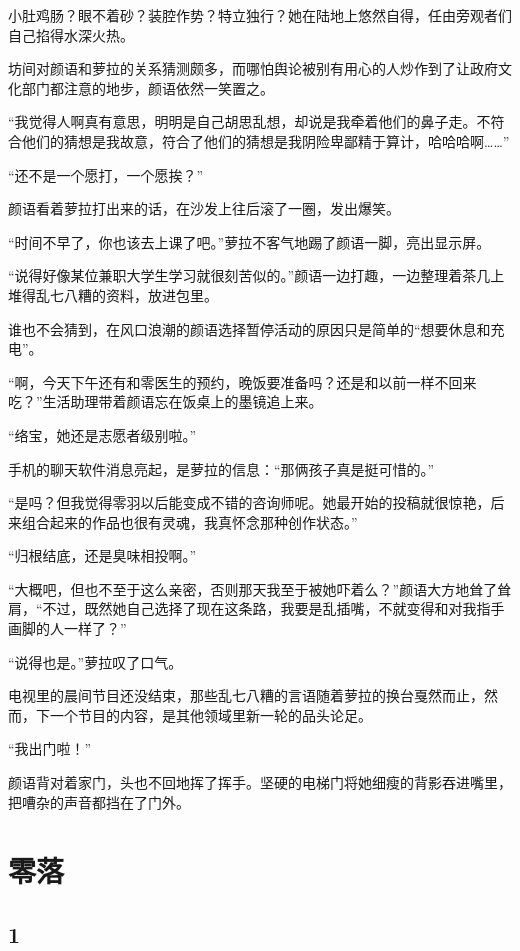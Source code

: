\documentclass[UTF8, scheme = chinese, openany]{ctexbook}
\begin{document}
小肚鸡肠？眼不着砂？装腔作势？特立独行？她在陆地上悠然自得，任由旁观者们自己掐得水深火热。

坊间对颜语和萝拉的关系猜测颇多，而哪怕舆论被别有用心的人炒作到了让政府文化部门都注意的地步，颜语依然一笑置之。

“我觉得人啊真有意思，明明是自己胡思乱想，却说是我牵着他们的鼻子走。不符合他们的猜想是我故意，符合了他们的猜想是我阴险卑鄙精于算计，哈哈哈啊……”

“还不是一个愿打，一个愿挨？”

颜语看着萝拉打出来的话，在沙发上往后滚了一圈，发出爆笑。

“时间不早了，你也该去上课了吧。”萝拉不客气地踢了颜语一脚，亮出显示屏。

“说得好像某位兼职大学生学习就很刻苦似的。”颜语一边打趣，一边整理着茶几上堆得乱七八糟的资料，放进包里。

谁也不会猜到，在风口浪潮的颜语选择暂停活动的原因只是简单的“想要休息和充电”。

“啊，今天下午还有和零医生的预约，晚饭要准备吗？还是和以前一样不回来吃？”生活助理带着颜语忘在饭桌上的墨镜追上来。

“络宝，她还是志愿者级别啦。”

手机的聊天软件消息亮起，是萝拉的信息：“那俩孩子真是挺可惜的。”

“是吗？但我觉得零羽以后能变成不错的咨询师呢。她最开始的投稿就很惊艳，后来组合起来的作品也很有灵魂，我真怀念那种创作状态。”

“归根结底，还是臭味相投啊。”

“大概吧，但也不至于这么亲密，否则那天我至于被她吓着么？”颜语大方地耸了耸肩，“不过，既然她自己选择了现在这条路，我要是乱插嘴，不就变得和对我指手画脚的人一样了？”

“说得也是。”萝拉叹了口气。

电视里的晨间节目还没结束，那些乱七八糟的言语随着萝拉的换台戛然而止，然而，下一个节目的内容，是其他领域里新一轮的品头论足。

“我出门啦！”

颜语背对着家门，头也不回地挥了挥手。坚硬的电梯门将她细瘦的背影吞进嘴里，把嘈杂的声音都挡在了门外。

\section{零落}

\subsection{1}
\end{document}
